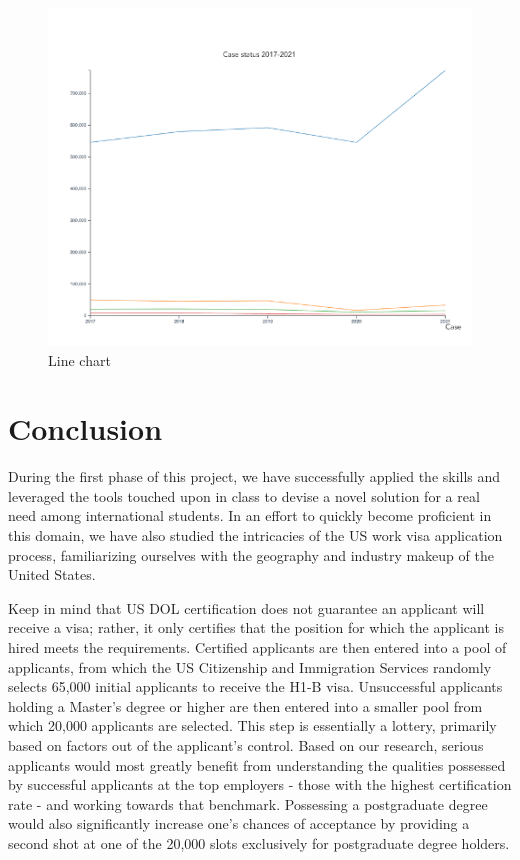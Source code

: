 \documentclass[sigconf]{acmart}
\begin{document}
\begin{figure}
  \includegraphics[width=\linewidth]{fig2.png}
  \caption{Line chart}
  \label{fig:linechart}
\end{figure}

\section{Conclusion}

During the first phase of this project, 
we have successfully applied the skills and leveraged the tools touched upon in class to devise a novel solution for a 
real need among international students. In an effort to quickly become proficient in this domain, we have also studied 
the intricacies of the US work visa application process, familiarizing ourselves with the geography and industry makeup 
of the United States. 

Keep in mind that US DOL certification does not guarantee an applicant will receive a visa; rather, it only certifies that the 
position for which the applicant is hired meets the requirements. Certified applicants are then entered into a pool of 
applicants, from which the US Citizenship and Immigration Services randomly selects 65,000 initial applicants to receive 
the H1-B visa. Unsuccessful applicants holding a Master's degree or higher are then entered into a smaller pool from which 
20,000 applicants are selected. This step is essentially a lottery, primarily based on factors out of 
the applicant's control. Based on our research, serious applicants would most greatly benefit from understanding the 
qualities possessed by successful applicants at the top employers - those with the highest certification rate - and 
working towards that benchmark. Possessing a postgraduate degree would also significantly increase one's chances of 
acceptance by providing a second shot at one of the 20,000 slots exclusively for postgraduate degree holders. 
\end{document}

